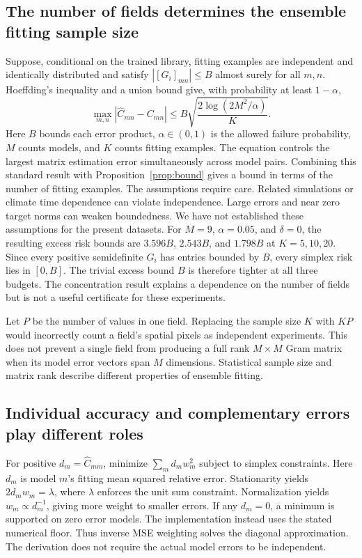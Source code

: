 \subsection{The number of fields determines the ensemble fitting sample size}
Suppose, conditional on the trained library, fitting examples are independent and identically
distributed and satisfy $|[G_i]_{mn}|\leq B$ almost surely for all $m,n$. Hoeffding's inequality
\citep{hoeffding1963} and a union bound give, with probability at least $1-\alpha$,
\begin{equation}
 \max_{m,n}|\widehat C_{mn}-C_{mn}|
 \leq B\sqrt{\frac{2\log(2M^2/\alpha)}{K}}.
\label{eq:hoeffding}
\end{equation}
Here $B$ bounds each error product, $\alpha\in(0,1)$ is the allowed failure
probability, $M$ counts models, and $K$ counts fitting examples. The equation
controls the largest matrix estimation error simultaneously across model pairs.
Combining this standard result with Proposition~\ref{prop:bound} gives a bound in
terms of the number of fitting examples. The assumptions require care.
Related simulations or climate time dependence can violate independence. Large
errors and near zero target norms can weaken boundedness.
We have not established these assumptions for the present datasets.
For $M=9$, $\alpha=0.05$, and $\delta=0$, the resulting excess risk
bounds are $3.596B$, $2.543B$, and $1.798B$ at $K=5,10,20$.
Since every positive semidefinite $G_i$ has entries bounded by $B$, every
simplex risk lies in $[0,B]$. The trivial excess bound $B$ is therefore tighter
at all three budgets. The concentration result explains a dependence on the
number of fields but is not a useful certificate for these experiments.

Let $P$ be the number of values in one field. Replacing the sample size $K$ with $KP$ would
incorrectly count a field's spatial pixels as independent experiments. This
does not prevent a single field from producing a full rank $M\times M$ Gram
matrix when its model error vectors span $M$ dimensions. Statistical sample
size and matrix rank describe different properties of ensemble fitting.

\subsection{Individual accuracy and complementary errors play different roles}
For positive $d_m=\widehat C_{mm}$, minimize $\sum_m d_m w_m^2$ subject to simplex constraints.
Here $d_m$ is model $m$'s fitting mean squared relative error. Stationarity
yields $2d_m w_m=\lambda$, where $\lambda$ enforces the unit sum constraint.
Normalization yields $w_m\propto d_m^{-1}$, giving more weight to smaller errors.
If any $d_m=0$, a minimum is supported on zero error models. The implementation instead uses
the stated numerical floor. Thus inverse MSE weighting solves the diagonal approximation.
The derivation does not require the actual model errors to be independent.

